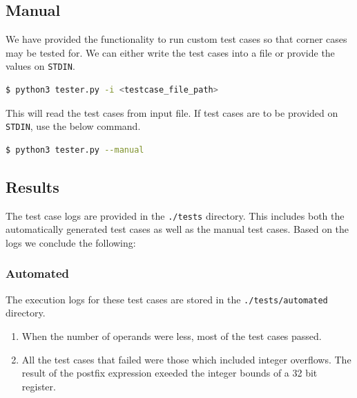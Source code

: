 \documentclass[hidelinks,12pt]{article}
\begin{document}
\subsection{Manual}
We have provided the functionality to run custom test cases so that corner cases may be tested for. We can either write the test cases into a file or provide the values on \verb|STDIN|.
\begin{lstlisting}[language=bash]
    $ python3 tester.py -i <testcase_file_path>
\end{lstlisting}
This will read the test cases from input file. If test cases are to be provided on \verb|STDIN|, use the below command.
\begin{lstlisting}[language=bash]
    $ python3 tester.py --manual
\end{lstlisting}
\subsection{Results}
The test case logs are provided in the \verb|./tests| directory. This includes both the automatically generated test cases as well as the manual test cases. Based on the logs we conclude the following:
\subsubsection{Automated}
The execution logs for these test cases are stored in the \verb|./tests/automated| directory.
\begin{enumerate}
    \item When the number of operands were less, most of the test cases passed.
    \item All the test cases that failed were those which included integer overflows. The result of the postfix expression exeeded the integer bounds of a 32 bit register.
\end{enumerate}
\end{document}
